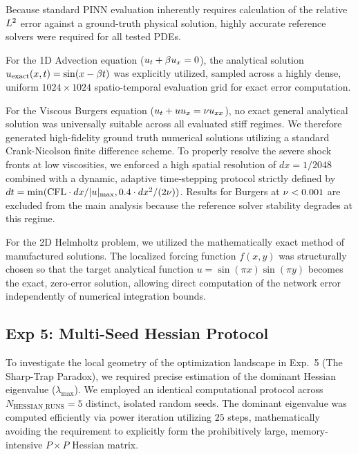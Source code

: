 Because standard PINN evaluation inherently requires calculation of the relative $L^2$ error against a ground-truth physical solution, highly accurate reference solvers were required for all tested PDEs. 

For the 1D Advection equation ($u_t + \beta u_x = 0$), the analytical solution $u_{\text{exact}}(x,t) = \sin(x - \beta t)$ was explicitly utilized, sampled across a highly dense, uniform $1024 \times 1024$ spatio-temporal evaluation grid for exact error computation.

For the Viscous Burgers equation ($u_t + u u_x = \nu u_{xx}$), no exact general analytical solution was universally suitable across all evaluated stiff regimes. We therefore generated high-fidelity ground truth numerical solutions utilizing a standard Crank-Nicolson finite difference scheme. To properly resolve the severe shock fronts at low viscosities, we enforced a high spatial resolution of $dx = 1/2048$ combined with a dynamic, adaptive time-stepping protocol strictly defined by $dt = \min(\text{CFL} \cdot dx/|u|_{\text{max}}, 0.4 \cdot dx^2/(2\nu))$. Results for Burgers at $\nu < 0.001$ are excluded from the main analysis because the reference solver stability degrades at this regime.

For the 2D Helmholtz problem, we utilized the mathematically exact method of manufactured solutions. The localized forcing function $f(x,y)$ was structurally chosen so that the target analytical function $u = \sin(\pi x)\sin(\pi y)$ becomes the exact, zero-error solution, allowing direct computation of the network error independently of numerical integration bounds.

\subsection{Exp 5: Multi-Seed Hessian Protocol}
\label{app:hessian}

To investigate the local geometry of the optimization landscape in Exp.~5 (The Sharp-Trap Paradox), we required precise estimation of the dominant Hessian eigenvalue ($\lambda_{\text{max}}$). We employed an identical computational protocol across $N_{\text{HESSIAN\_RUNS}} = 5$ distinct, isolated random seeds. The dominant eigenvalue was computed efficiently via power iteration utilizing $25$ steps, mathematically avoiding the requirement to explicitly form the prohibitively large, memory-intensive $P \times P$ Hessian matrix.

